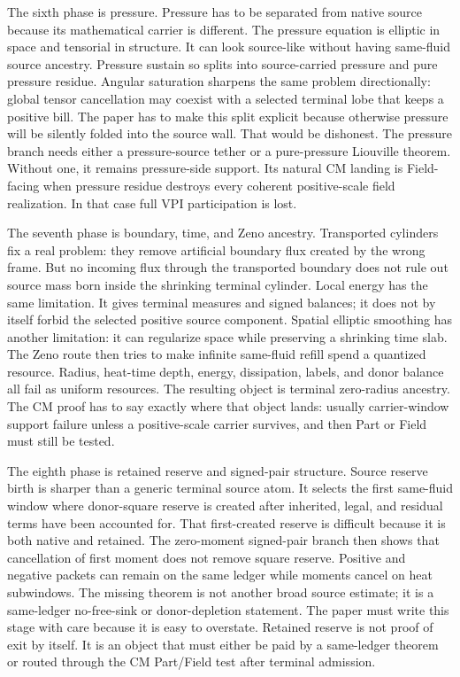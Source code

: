 The sixth phase is pressure.
Pressure has to be separated from native source because its mathematical
carrier is different.
The pressure equation is elliptic in space and tensorial in structure.
It can look source-like without having same-fluid source ancestry.
Pressure sustain so splits into source-carried pressure and pure
pressure residue.
Angular saturation sharpens the same problem directionally: global tensor
cancellation may coexist with a selected terminal lobe that keeps a positive
bill.
The paper has to make this split explicit because otherwise pressure will be
silently folded into the source wall.
That would be dishonest.
The pressure branch needs either a pressure-source tether or a pure-pressure
Liouville theorem.
Without one, it remains pressure-side support.
Its natural CM landing is Field-facing when pressure residue destroys every
coherent positive-scale field realization.  In that case full VPI
participation is lost.

The seventh phase is boundary, time, and Zeno ancestry.
Transported cylinders fix a real problem: they remove artificial boundary
flux created by the wrong frame.
But no incoming flux through the transported boundary does not rule out source
mass born inside the shrinking terminal cylinder.
Local energy has the same limitation.
It gives terminal measures and signed balances; it does not by itself forbid
the selected positive source component.
Spatial elliptic smoothing has another limitation: it can regularize space
while preserving a shrinking time slab.
The Zeno route then tries to make infinite same-fluid refill spend a quantized
resource.
Radius, heat-time depth, energy, dissipation, labels, and donor balance all
fail as uniform resources.
The resulting object is terminal zero-radius ancestry.
The CM proof has to say exactly where that object lands: usually carrier-window support
failure unless a positive-scale carrier survives, and then Part or Field must
still be tested.

The eighth phase is retained reserve and signed-pair structure.
Source reserve birth is sharper than a generic terminal source atom.
It selects the first same-fluid window where donor-square reserve is created
after inherited, legal, and residual terms have been accounted for.
That first-created reserve is difficult because it is both native and retained.
The zero-moment signed-pair branch then shows that cancellation of first moment
does not remove square reserve.
Positive and negative packets can remain on the same ledger while moments
cancel on heat subwindows.
The missing theorem is not another broad source estimate; it is a same-ledger
no-free-sink or donor-depletion statement.
The paper must write this stage with care because it is easy to overstate.
Retained reserve is not proof of exit by itself.
It is an object that must either be paid by a same-ledger theorem or routed
through the CM Part/Field test after terminal admission.

